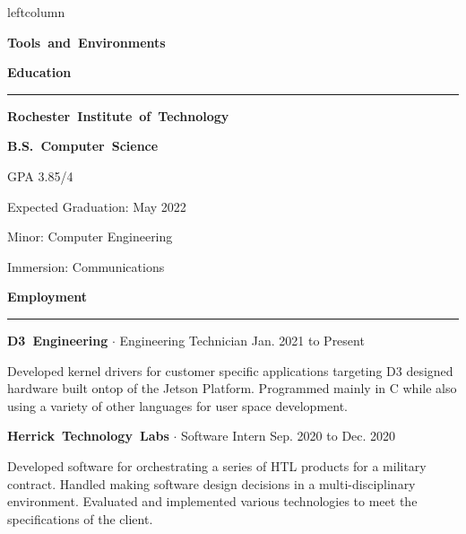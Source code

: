 \documentclass{article}
\newcommand{\rSection}[1] {
  \textcolor{header-blue} {
    \textbf{{\fontsize{0.5cm}{0.45cm}\selectfont \hbox{#1}}} \\
    \rule{0.30\textwidth}{0.1cm}
  }
}
\newcommand{\rSubSection}[1] {
  \textbf{{\fontsize{0.4cm}{0.45cm}\selectfont \hbox{#1}}}
}
\newcommand{\rSubSubSection}[1] {
  \textbf{{\fontsize{0.35cm}{0.45cm}\selectfont \hbox{#1}}}
}
\newcommand\level[2]{%
  \tikz{%
    \ifx#20
    \else
      \foreach \i in {1,...,#2} {
        \filldraw[black!20] (\i ex,0) circle (0.4ex);
      };
    \fi
    \ifx#10
    \else
      \foreach \i in {1,...,#1} {
        \filldraw[black] (\i ex,0) circle (0.4ex);
      };
    \fi
  }
}
\begin{document}
\begin{dynamiccontents*}{leftcolumn}
  \rSubSection{Tools and Environments} \par \bigskip


\end{dynamiccontents*}

\rSection{Education} \par \bigskip
\rSubSubSection{Rochester Institute of Technology} \par
\rSubSubSection{B.S. Computer Science} \par
GPA 3.85/4 \par
Expected Graduation: May 2022 \par
Minor: Computer Engineering \par
Immersion: Communications \par


\rSection{Employment} \par

\rSubSubSection{D3 Engineering} $ \cdot $ Engineering Technician \hfill Jan. 2021 to Present \par
Developed kernel drivers for customer specific applications targeting D3 designed hardware built
ontop of the Jetson Platform. Programmed mainly in C while also using a variety of other languages
for user space development. \par \bigskip

\rSubSubSection{Herrick Technology Labs} $ \cdot $ Software Intern \hfill Sep. 2020 to Dec. 2020 \par
Developed software for orchestrating a series of HTL products for a military contract. Handled making
software design decisions in a multi-disciplinary environment. Evaluated and implemented various technologies
to meet the specifications of the client. \par \bigskip
\end{document}
